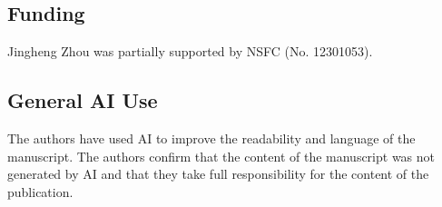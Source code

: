 \documentclass{amsart}
\theoremstyle{definition}
\theoremstyle{remark}
\numberwithin{equation}{section}
\begin{document}
\subsection*{Funding} 
Jingheng Zhou was partially supported by NSFC (No. 12301053).

\subsection*{General AI Use}
The authors have used AI to improve the readability and language of the manuscript. The authors confirm that the content of the manuscript was not generated by AI and that they take full responsibility for the content of the publication.

\providecommand{\bysame}{\leavevmode\hbox to3em{\hrulefill}\thinspace}
\providecommand{\MR}{\relax\ifhmode\unskip\space\fi MR }
\providecommand{\MRhref}[2]{%
  \href{http://www.ams.org/mathscinet-getitem?mr=#1}{#2}
}
\providecommand{\href}[2]{#2}
\end{document}
